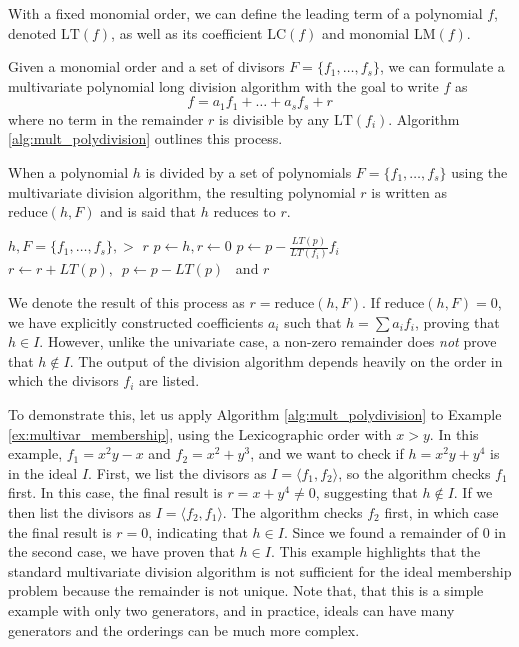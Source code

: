 With a fixed monomial order, we can define the leading term of a polynomial $f$, denoted $\text{LT}(f)$, as well as its coefficient $\text{LC}(f)$ and monomial $\text{LM}(f)$.

Given a monomial order and a set of divisors $F = \{f_1, \dots, f_s\}$, we can formulate a multivariate polynomial long division algorithm with the goal to write $f$ as
$$ f = a_1 f_1 + \dots + a_s f_s + r $$
where no term in the remainder $r$ is divisible by any $\text{LT}(f_i)$. Algorithm \ref{alg:mult_polydivision} outlines this process.

\begin{definition}[Reduction]
\label{def:reduction}
When a polynomial $h$ is divided by a set of polynomials $F = \{f_1, \dots, f_s\}$ using the multivariate division algorithm, the resulting polynomial $r$ is written as $\text{reduce}(h, F)$ and is said that $h$ reduces to $r$.
\end{definition}

\begin{algorithm}[H]
\caption{Multivariate Division Algorithm} 
\label{alg:mult_polydivision}
\begin{algorithmic}
\Require $h, F=\{f_1, \dots, f_s\}, >$
\Ensure $r$
\State $p \gets h, r \gets 0$
        \State $p \gets p - \frac{LT(p)}{LT(f_i)} f_i$
    \Else
        \State $r \gets r + LT(p), \enspace p \gets p - LT(p)$
    \EndIf
\EndWhile \ and \Return $r$
\end{algorithmic}
\end{algorithm}

We denote the result of this process as $r = \text{reduce}(h, F)$. If $\text{reduce}(h, F) = 0$, we have explicitly constructed coefficients $a_i$ such that $h = \sum a_i f_i$, proving that $h \in I$. However, unlike the univariate case, a non-zero remainder does \textit{not} prove that $h \notin I$. The output of the division algorithm depends heavily on the order in which the divisors $f_i$ are listed.

To demonstrate this, let us apply Algorithm \ref{alg:mult_polydivision} to Example \ref{ex:multivar_membership}, using the Lexicographic order with $x > y$. In this example, $f_1 = x^2 y - x$ and $f_2 = x^2 + y^3$, and we want to check if $h = x^2 y + y^4$ is in the ideal $I$. First, we list the divisors as $I = \langle f_1, f_2 \rangle$, so the algorithm checks $f_1$ first. In this case, the final result is $r = x + y^4 \neq 0$, suggesting that $h \notin I$. If we then list the divisors as $I = \langle f_2, f_1 \rangle$. The algorithm checks $f_2$ first, in which case the final result is $r = 0$, indicating that $h \in I$. Since we found a remainder of 0 in the second case, we have proven that $h \in I$. This example highlights that the standard multivariate division algorithm is not sufficient for the ideal membership problem because the remainder is not unique. Note that, that this is a simple example with only two generators, and in practice, ideals can have many generators and the orderings can be much more complex.

